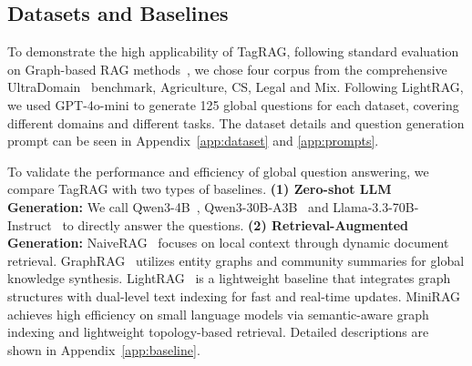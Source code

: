 \documentclass[11pt]{article}
\begin{document}
\subsection{Datasets and Baselines}
To demonstrate the high applicability of TagRAG, following standard evaluation on Graph-based RAG methods~\cite{edge2024local,guo2024lightrag,chen2025pathrag}, we chose four corpus from the comprehensive UltraDomain~\cite{qian2025memorag} benchmark, Agriculture, CS, Legal and Mix.
Following LightRAG, we used GPT-4o-mini to generate 125 global questions for each dataset, covering different domains and different tasks.
The dataset details and question generation prompt can be seen in Appendix~\ref{app:dataset} and \ref{app:prompts}.




To validate the performance and efficiency of global question answering, we compare TagRAG with two types of baselines. \textbf{(1) Zero-shot LLM Generation:} We call Qwen3-4B~\cite{qwen3technicalreport}, Qwen3-30B-A3B~\cite{qwen3technicalreport} and Llama-3.3-70B-Instruct~\cite{grattafiori2024llama3herdmodels} to directly answer the questions. \textbf{(2) Retrieval-Augmented Generation:} NaiveRAG~\cite{lewis2020retrieval} focuses on local context through dynamic document retrieval. GraphRAG~\cite{edge2024local} utilizes entity graphs and community summaries for global knowledge synthesis. LightRAG~\cite{guo2024lightrag} is a lightweight baseline that integrates graph structures with dual-level text indexing for fast and real-time updates. MiniRAG~\cite{fan2025minirag} achieves high efficiency on small language models via semantic-aware graph indexing and lightweight topology-based retrieval. Detailed descriptions are shown in Appendix~\ref{app:baseline}.
\end{document}
